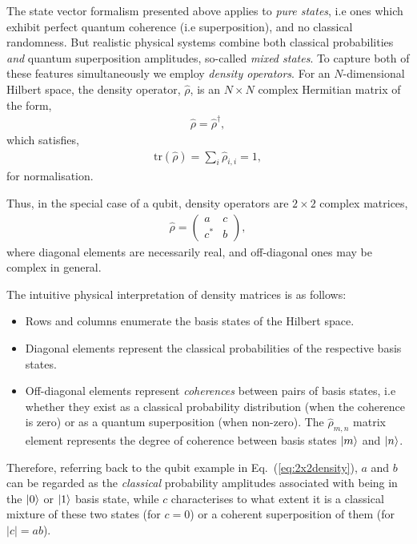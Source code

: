 The state vector formalism presented above applies to \textit{pure states}, i.e ones which exhibit perfect quantum coherence (i.e superposition), and no classical randomness. But realistic physical systems combine both classical probabilities \textit{and} quantum superposition amplitudes, so-called \textit{mixed states}. To capture both of these features simultaneously we employ \textit{density operators}. For an $N$-dimensional Hilbert space, the density operator, $\hat\rho$, is an \mbox{$N\times N$} complex Hermitian matrix of the form,
\begin{align}
	\hat\rho = \hat\rho^\dag,
\end{align}
which satisfies,
\begin{align}
\mathrm{tr}(\hat\rho)=\sum_i \hat\rho_{i,i} = 1,	
\end{align}
for normalisation.

Thus, in the special case of a qubit, density operators are \mbox{$2\times 2$} complex matrices,
\begin{align}\label{eq:2x2density}
\hat\rho = \left(\begin{matrix}{}
  a & c \\
  c^* & b
\end{matrix}\right),
\end{align}
where diagonal elements are necessarily real, and off-diagonal ones may be complex in general.

The intuitive physical interpretation of density matrices is as follows:
\begin{itemize}
\item Rows and columns enumerate the basis states of the Hilbert space.
\item Diagonal elements represent the classical probabilities of the respective basis states.
\item Off-diagonal elements represent \textit{coherences} between pairs of basis states, i.e whether they exist as a classical probability distribution (when the coherence is zero) or as a quantum superposition (when non-zero). The $\hat\rho_{m,n}$ matrix element represents the degree of coherence between basis states $|m\rangle$ and $|n\rangle$.
\end{itemize}

Therefore, referring back to the qubit example in Eq.~(\ref{eq:2x2density}), $a$ and $b$ can be regarded as the \textit{classical} probability amplitudes associated with being in the $|0\rangle$ or $|1\rangle$ basis state, while $c$ characterises to what extent it is a classical mixture of these two states (for \mbox{$c=0$}) or a coherent superposition of them (for \mbox{$|c|=ab$}).

